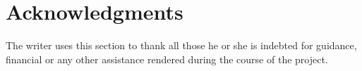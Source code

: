 
\chapter*{Acknowledgments}

The writer uses this section to thank all those he or she is indebted for guidance, financial or
any other assistance rendered during the course of the project.


